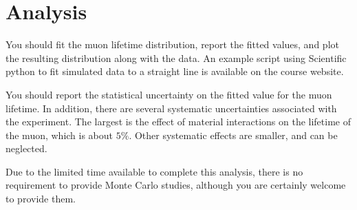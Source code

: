 


\section{Analysis}

You should fit the muon lifetime distribution, report the fitted values, and plot the resulting distribution along with the data.  An example script using Scientific python to fit simulated data to a straight line is available on the course website.

You should report the statistical uncertainty on the fitted value for the muon lifetime.    In addition, there are several systematic uncertainties associated with the experiment.  The largest is the effect of material interactions on the lifetime of the muon, which is about $5\%$.   Other systematic effects are smaller, and can be neglected.

Due to the limited time available to complete this analysis, there is no requirement to provide Monte Carlo studies, although you are certainly welcome to provide them.




